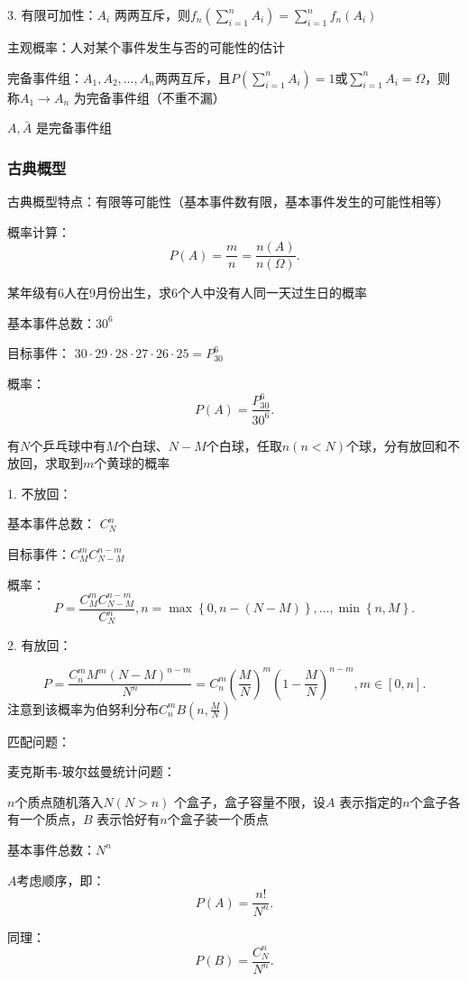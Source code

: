 3. 有限可加性：$A_i$ 两两互斥，则$f_n\left( \sum_{i=1}^{n} A_i \right) =\sum_{i=1}^{n} f_n\left( A_i \right) $
\begin{defi}
    主观概率：人对某个事件发生与否的可能性的估计
\end{defi}

\begin{defi}
    完备事件组：$A_1,A_2,\ldots,A_n$两两互斥，且$ P\left( \sum_{i=1}^{n} A_i \right) =1$或$\sum_{i=1}^{n} A_i=\Omega$，则称$A_1\to A_n$ 为完备事件组（不重不漏）
\end{defi}
\begin{eg}
    $A,\bar{A}$ 是完备事件组
\end{eg}

\subsubsection{古典概型}%
\label{subsub:古典概型}
古典概型特点：有限等可能性（基本事件数有限，基本事件发生的可能性相等）
\begin{notation}
    概率计算：\[
        P\left( A \right) =\frac{m}{n} = \frac{n\left( A \right) }{n\left( \Omega \right) }
    .\] 
\end{notation}
\begin{eg}
    某年级有6人在9月份出生，求6个人中没有人同一天过生日的概率

    基本事件总数：$30^6$

    目标事件： $30\cdot 29\cdot 28\cdot 27\cdot 26\cdot 25=P_{30}^{6}$ 

    概率：\[
        P\left( A \right) =\frac{P_{30}^{6}}{30^6}
    .\] 
\end{eg}
\begin{eg}
    有$N$个乒乓球中有$M$个白球、$N-M$个白球，任取$n(n<N)$个球，分有放回和不放回，求取到$m$个黄球的概率

    1. 不放回：

    基本事件总数： $C_{N}^{n}$ 

    目标事件：$C_{M}^{m}C_{N-M}^{n-m}$ 

    概率： \[
        P=\frac{C_{M}^{m}C_{N-M}^{n-m}}{C_{N}^{n}},n=\max\left\{ 0,n-\left( N-M \right)  \right\}, \ldots,\min\left\{ n,M \right\} 
    .\] 

    2. 有放回：

    \[
    P=\frac{C_{n}^{m}M^m\left( N-M \right) ^{n-m}}{N^n}=C_{n}^{m}\left( \frac{M}{N} \right) ^m\left( 1-\frac{M}{N} \right) ^{n-m},m\in \left[ 0,n \right]
    .\] 
    注意到该概率为伯努利分布$C_{n}^{m}B\left( n,\frac{M}{N} \right) $
\end{eg}
匹配问题：
\begin{eg}
    麦克斯韦-玻尔兹曼统计问题：

    $n$个质点随机落入$N\left( N>n \right) $ 个盒子，盒子容量不限，设$A$ 表示指定的$n$个盒子各有一个质点，$B$ 表示恰好有$n$个盒子装一个质点

    基本事件总数：$N^n$ 

    $A$考虑顺序，即：\[
        P\left( A \right) =\frac{n!}{N^n}
    .\] 

    同理：\[
        P\left( B \right) =\frac{C_{N}^{n}}{N^n}
    .\] 
\end{eg}        
